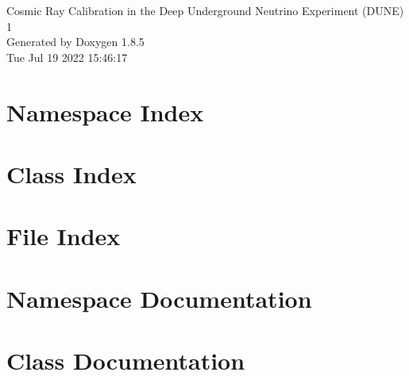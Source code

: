 \documentclass[twoside]{book}
\newcommand{\clearemptydoublepage}{%
  \newpage{\pagestyle{empty}\cleardoublepage}%
}
\begin{document}
\hypersetup{pageanchor=false}
\begin{titlepage}
\vspace*{7cm}
\begin{center}%
{\Large Cosmic Ray Calibration in the Deep Underground Neutrino Experiment (D\-U\-N\-E) \\[1ex]\large 1 }\\
\vspace*{1cm}
{\large Generated by Doxygen 1.8.5}\\
\vspace*{0.5cm}
{\small Tue Jul 19 2022 15:46:17}\\
\end{center}
\end{titlepage}
\clearemptydoublepage
\tableofcontents
\clearemptydoublepage
{}
\hypersetup{pageanchor=true}

\chapter{Namespace Index}

\chapter{Class Index}

\chapter{File Index}

\chapter{Namespace Documentation}



\chapter{Class Documentation}





\end{document}
